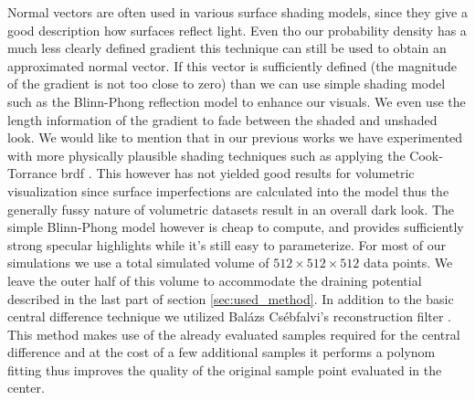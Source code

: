 Normal vectors are often used in various surface shading models, since they give a good description how surfaces reflect light.
Even tho our probability density has a much less clearly defined gradient this technique can still be used to obtain an approximated normal vector.
If this vector is sufficiently defined (the magnitude of the gradient is not too close to zero) than we can use simple shading model such as the Blinn-Phong reflection model \cite{Blinn1977} to enhance our visuals.
We even use the length information of the gradient to fade between the shaded and unshaded look.
We would like to mention that in our previous works we have experimented with more physically plausible shading techniques such as applying the Cook-Torrance \acrfull{brdf} \cite{CookTorrance1982}.
This however has not yielded good results for volumetric visualization since surface imperfections are calculated into the model thus the generally fussy nature of volumetric datasets result in an overall dark look.
The simple Blinn-Phong model however is cheap to compute, and provides sufficiently strong specular highlights while it's still easy to parameterize.
For most of our simulations we use a total simulated volume of $512\times 512 \times 512$ data points.
We leave the outer half of this volume to accommodate the draining potential described in the last part of section \ref{sec:used_method}.
In addition to the basic central difference technique we utilized Balázs Csébfalvi's reconstruction filter \cite{csebfalvi2023}.
This method makes use of the already evaluated samples required for the central difference and at the cost of a few additional samples it performs a polynom fitting thus improves the quality of the original sample point evaluated in the center.












